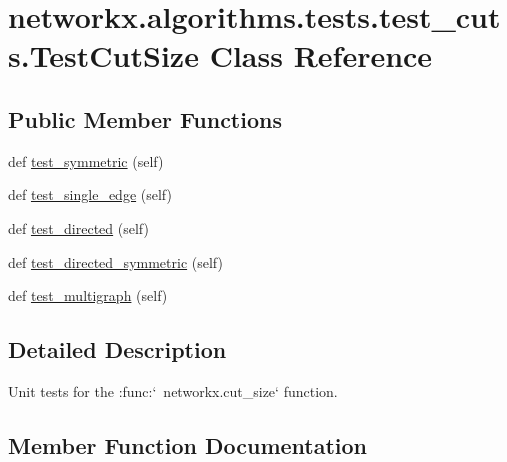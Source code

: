 \hypertarget{classnetworkx_1_1algorithms_1_1tests_1_1test__cuts_1_1TestCutSize}{}\section{networkx.\+algorithms.\+tests.\+test\+\_\+cuts.\+Test\+Cut\+Size Class Reference}
\label{classnetworkx_1_1algorithms_1_1tests_1_1test__cuts_1_1TestCutSize}
\subsection*{Public Member Functions}
\begin{DoxyCompactItemize}
\item 
def \hyperlink{classnetworkx_1_1algorithms_1_1tests_1_1test__cuts_1_1TestCutSize_a511793163fe12224040ab7860f63d0ce}{test\+\_\+symmetric} (self)
\item 
def \hyperlink{classnetworkx_1_1algorithms_1_1tests_1_1test__cuts_1_1TestCutSize_ac2d3d8e92523ed8a17c4cc07d3d16855}{test\+\_\+single\+\_\+edge} (self)
\item 
def \hyperlink{classnetworkx_1_1algorithms_1_1tests_1_1test__cuts_1_1TestCutSize_adbe181b084b2dd4825cd9725011544e5}{test\+\_\+directed} (self)
\item 
def \hyperlink{classnetworkx_1_1algorithms_1_1tests_1_1test__cuts_1_1TestCutSize_aa0ffacfc73fef5d174fee91bc4e0ffeb}{test\+\_\+directed\+\_\+symmetric} (self)
\item 
def \hyperlink{classnetworkx_1_1algorithms_1_1tests_1_1test__cuts_1_1TestCutSize_ae73625070821a487105ac1adf7bfc025}{test\+\_\+multigraph} (self)
\end{DoxyCompactItemize}


\subsection{Detailed Description}
\begin{DoxyVerb}Unit tests for the :func:`~networkx.cut_size` function.\end{DoxyVerb}
 

\subsection{Member Function Documentation}
\mbox{\label{classnetworkx_1_1algorithms_1_1tests_1_1test__cuts_1_1TestCutSize_adbe181b084b2dd4825cd9725011544e5}} 

